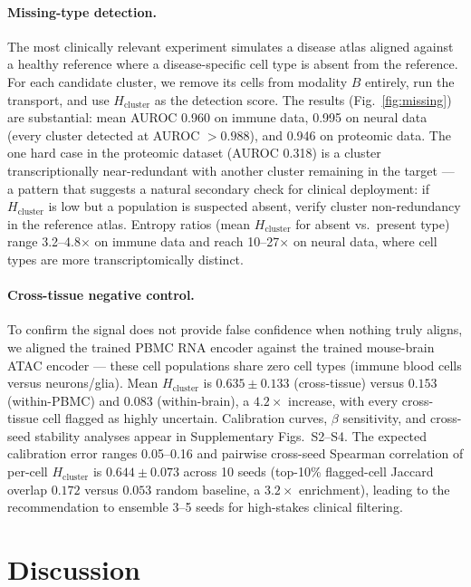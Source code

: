 \documentclass[pmlr]{jmlr}
\newcommand{\Hcluster}{H_{\text{cluster}}}
\begin{document}
\paragraph{Missing-type detection.} The most clinically relevant experiment simulates a disease atlas aligned against a healthy reference where a disease-specific cell type is absent from the reference. For each candidate cluster, we remove its cells from modality $B$ entirely, run the transport, and use $\Hcluster$ as the detection score. The results (Fig.~\ref{fig:missing}) are substantial: mean AUROC 0.960 on immune data, 0.995 on neural data (every cluster detected at AUROC $> 0.988$), and 0.946 on proteomic data. The one hard case in the proteomic dataset (AUROC 0.318) is a cluster transcriptionally near-redundant with another cluster remaining in the target --- a pattern that suggests a natural secondary check for clinical deployment: if $\Hcluster$ is low but a population is suspected absent, verify cluster non-redundancy in the reference atlas. Entropy ratios (mean $\Hcluster$ for absent vs.\ present type) range 3.2--4.8$\times$ on immune data and reach 10--27$\times$ on neural data, where cell types are more transcriptomically distinct.

\paragraph{Cross-tissue negative control.} To confirm the signal does not provide false confidence when nothing truly aligns, we aligned the trained PBMC RNA encoder against the trained mouse-brain ATAC encoder --- these cell populations share zero cell types (immune blood cells versus neurons/glia). Mean $\Hcluster$ is $0.635 \pm 0.133$ (cross-tissue) versus $0.153$ (within-PBMC) and $0.083$ (within-brain), a $4.2\times$ increase, with every cross-tissue cell flagged as highly uncertain. Calibration curves, $\beta$ sensitivity, and cross-seed stability analyses appear in Supplementary Figs.~S2--S4. The expected calibration error ranges 0.05--0.16 and pairwise cross-seed Spearman correlation of per-cell $\Hcluster$ is $0.644 \pm 0.073$ across 10 seeds (top-10\% flagged-cell Jaccard overlap $0.172$ versus $0.053$ random baseline, a $3.2\times$ enrichment), leading to the recommendation to ensemble 3--5 seeds for high-stakes clinical filtering.

\section{Discussion}
\label{sec:discussion}
\end{document}
